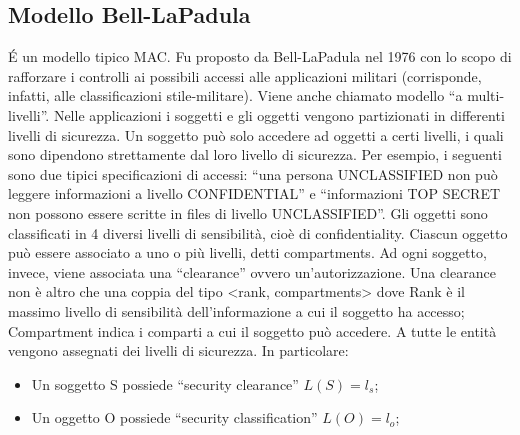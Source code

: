 \subsection{Modello Bell-LaPadula}
\'{E} un modello tipico MAC. Fu proposto da Bell-LaPadula nel 1976 con lo scopo di 
rafforzare i
controlli ai possibili accessi alle applicazioni militari (corrisponde, infatti, 
alle classificazioni
stile-militare). Viene anche chiamato modello “a multi-livelli”.
Nelle applicazioni i soggetti e gli oggetti vengono partizionati in differenti 
livelli di sicurezza. Un
soggetto può solo accedere ad oggetti a certi livelli, i quali sono dipendono 
strettamente dal loro
livello di sicurezza. Per esempio, i seguenti sono due tipici specificazioni di 
accessi: “una persona
UNCLASSIFIED non può leggere informazioni a livello CONFIDENTIAL” e 
“informazioni TOP
SECRET non possono essere scritte in files di livello UNCLASSIFIED”.
Gli oggetti sono classificati in 4 diversi livelli di sensibilità, cioè di 
confidentiality. Ciascun oggetto
può essere associato a uno o più livelli, detti compartments.
Ad ogni soggetto, invece, viene associata una “clearance” ovvero 
un’autorizzazione. Una
clearance non è altro che una coppia del tipo <rank, compartments> dove Rank è 
il massimo
livello di sensibilità dell’informazione a cui il soggetto ha accesso; 
Compartment indica i comparti a
cui il soggetto può accedere.
A tutte le entità vengono assegnati dei livelli di sicurezza. In particolare:

\begin{itemize}
      \item Un soggetto S possiede “security clearance” \(L(S)=l_s\);
      \item Un oggetto O possiede “security classification” \(L(O)=l_o\);
\end{itemize}

